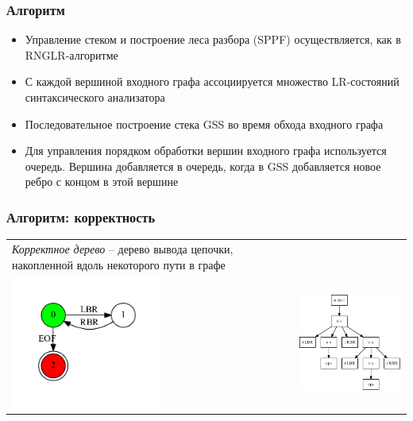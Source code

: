 \documentclass{beamer}
\begin{document}
\begin{frame}
  \transwipe[direction=90]
  \frametitle{Алгоритм}
  \begin{itemize}
    \item Управление стеком и построение леса разбора (SPPF) осуществляется, 
как в RNGLR-алгоритме
    \item С каждой вершиной входного графа ассоциируется множество LR-состояний синтаксического анализатора
    \item Последовательное построение стека GSS во время обхода входного графа
    \item Для управления порядком обработки вершин входного графа используется 
очередь. Вершина добавляется в очередь, когда в GSS добавляется новое ребро с 
концом в этой вершине
  \end{itemize}
\end{frame}

\begin{frame}
\transwipe[direction=90]
\frametitle{Алгоритм: корректность}
\begin{tabular}{p{5.3cm} p{6.7cm}}
\emph{Корректное дерево} -- дерево вывода цепочки, накопленной вдоль некоторого 
пути в графе
&
\\
\includegraphics[width=5cm]{pictures/in3.pdf}
&
\includegraphics[width=6cm]{pictures/sppf2.eps}
\end{tabular}
\end{frame}
\end{document}
